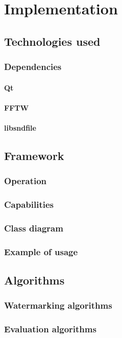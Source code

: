 \chapter{Implementation}
\section{Technologies used}
\subsection{Dependencies}
\subsubsection{Qt}
\subsubsection{FFTW}
\subsubsection{libsndfile}
\section{Framework}
\subsection{Operation}
\subsection{Capabilities}
\subsection{Class diagram}
\subsection{Example of usage}
\section{Algorithms}
\subsection{Watermarking algorithms}
\subsection{Evaluation algorithms}
